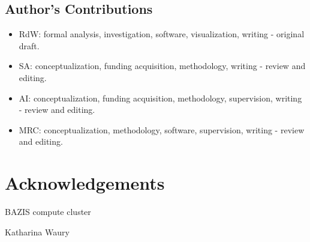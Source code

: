 
\subsection{Author's Contributions}

\begin{itemize}
\item RdW: formal analysis, investigation, software, visualization, writing - original draft.

\item SA: conceptualization, funding acquisition, methodology, writing - review and editing.

\item AI: conceptualization, funding acquisition, methodology, supervision, writing - review and editing.

\item MRC: conceptualization, methodology, software, supervision, writing - review and editing.
\end{itemize}

\section{Acknowledgements}

BAZIS compute cluster

Katharina Waury





